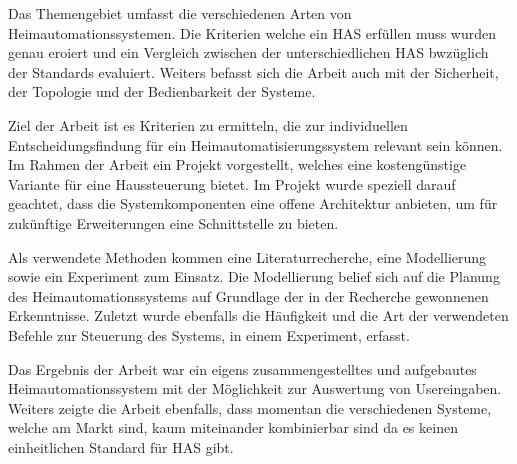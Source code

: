 

 Das Themengebiet umfasst die verschiedenen Arten von
Heimautomationssystemen. Die Kriterien welche ein HAS erfüllen muss wurden
genau eroiert und ein Vergleich zwischen der unterschiedlichen HAS bwzüglich
der Standards evaluiert. Weiters befasst sich die Arbeit auch mit der
Sicherheit, der Topologie und der Bedienbarkeit der Systeme.~\cite[Kap.~1]{Brandstetter}

 Ziel der Arbeit ist es Kriterien zu ermitteln, die
zur individuellen Entscheidungsfindung für ein Heimautomatisierungssystem
relevant sein können. Im Rahmen der Arbeit ein Projekt vorgestellt, welches
eine kostengünstige Variante für eine Haussteuerung bietet. Im Projekt wurde
speziell darauf geachtet, dass die Systemkomponenten eine offene Architektur
anbieten, um für zukünftige Erweiterungen eine Schnittstelle zu bieten.~\cite[Kap.~8]{Brandstetter}

 Als verwendete Methoden kommen eine
Literaturrecherche, eine Modellierung sowie ein Experiment zum Einsatz. Die
Modellierung belief sich auf die Planung des Heimautomationssystems auf
Grundlage der in der Recherche gewonnenen Erkenntnisse. Zuletzt wurde
ebenfalls die Häufigkeit und die Art der verwendeten Befehle zur Steuerung des
Systems, in einem Experiment, erfasst.~\cite[Kap.~8,~11]{Brandstetter}

 Das Ergebnis der Arbeit war ein eigens zusammengestelltes
und aufgebautes Heimautomationssystem mit der Möglichkeit zur Auswertung von
Usereingaben. Weiters zeigte die Arbeit ebenfalls, dass momentan die
verschiedenen Systeme, welche am Markt sind, kaum miteinander kombinierbar
sind da es keinen einheitlichen Standard für HAS gibt.~\cite[Kap.~8,~11,~12]{Brandstetter}


%
\section*{\thesisheading} %


